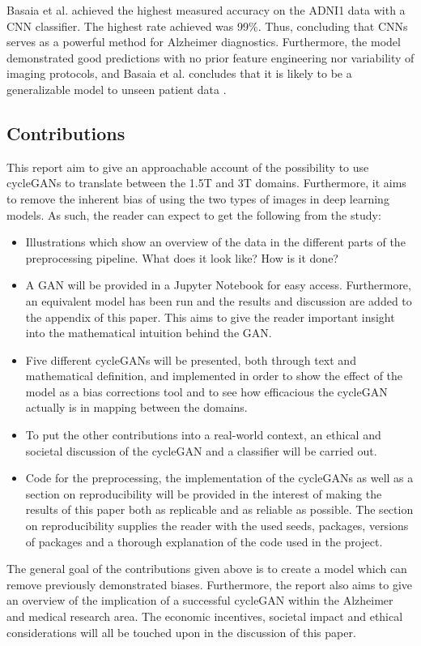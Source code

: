 \documentclass[12pt, fleqn, titlepage]{article}
\newcommand{\1}[1]{\mathds{1}\left[#1\right]}
\begin{document}
Basaia et al. achieved the highest measured accuracy on the ADNI1 data with a CNN classifier. The highest rate achieved was 99\%. Thus, concluding that CNNs serves as a powerful method for Alzheimer diagnostics. Furthermore, the model demonstrated good predictions with no prior feature engineering nor variability of imaging protocols, and Basaia et al. concludes that it is likely to be a generalizable model to unseen patient data \cite{neuro}. 

\subsection{Contributions}

This report aim to give an approachable account of the possibility to use cycleGANs to translate between the 1.5T and 3T domains. Furthermore, it aims to remove the inherent bias of using the two types of images in deep learning models. As such, the reader can expect to get the following from the study:

\begin{itemize}
	\item Illustrations which show an overview of the data in the different parts of the preprocessing pipeline. What does it look like? How is it done?
	
	\item A GAN will be provided in a Jupyter Notebook for easy access. Furthermore, an equivalent model has been run and the results and discussion are added to the appendix of this paper. This aims to give the reader important insight into the mathematical intuition behind the GAN.
	
	\item Five different cycleGANs will be presented, both through text and mathematical definition, and implemented in order to show the effect of the model as a bias corrections tool and to see how efficacious the cycleGAN actually is in mapping between the domains.
	
	\item To put the other contributions into a real-world context, an ethical and societal discussion of the cycleGAN and a classifier will be carried out. 
	
	\item Code for the preprocessing, the implementation of the cycleGANs as well as a section on reproducibility will be provided in the interest of making the results of this paper both as replicable and as reliable as possible. The section on reproducibility supplies the reader with the used seeds, packages, versions of packages and a thorough explanation of the code used in the project.
\end{itemize}
\noindent
The general goal of the contributions given above is to create a model which can remove previously demonstrated biases. Furthermore, the report also aims to give an overview of the implication of a successful cycleGAN within the Alzheimer and medical research area. The economic incentives, societal impact and ethical considerations will all be touched upon in the discussion of this paper. 
\end{document}
